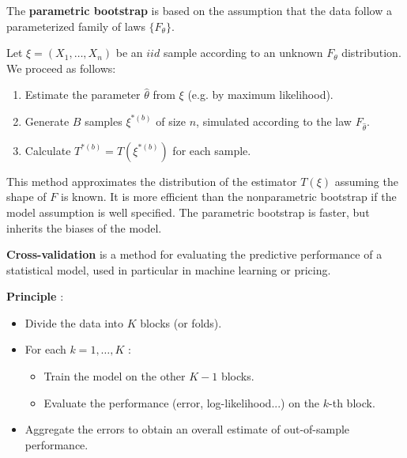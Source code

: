 \begin{f}
	
	The \textbf{parametric bootstrap} is based on the assumption that the data follow a parameterized family of laws $\{F_\theta\}$.
	
	Let $\xi = (X_1, \ldots, X_n)$ be an $iid$ sample according to an unknown $F_\theta$ distribution. We proceed as follows:
	\begin{enumerate}
		\item Estimate the parameter $\hat{\theta}$ from $\xi$ (e.g. by maximum likelihood).
		\item Generate $B$ samples $\xi^{\ast(b)}$ of size $n$, simulated according to the law $F_{\hat{\theta}}$.
		\item Calculate $T^{\ast(b)} = T(\xi^{\ast(b)})$ for each sample.
	\end{enumerate}
	
	This method approximates the distribution of the estimator $T(\xi)$ assuming the shape of $F$ is known. It is more efficient than the nonparametric bootstrap if the model assumption is well specified. The parametric bootstrap is faster, but inherits the biases of the model.
	
\end{f}

\begin{f}
	
	\textbf{Cross-validation} is a method for evaluating the predictive performance of a statistical model, used in particular in machine learning or pricing.
	
	\textbf{Principle} :
	\begin{itemize}
		\item Divide the data into $K$ blocks (or folds).
		\item For each $k = 1,\ldots,K$ :
		\begin{itemize}
			\item Train the model on the other $K-1$ blocks.
			\item Evaluate the performance (error, log-likelihood...) on the $k$-th block.
		\end{itemize}
		\item Aggregate the errors to obtain an overall estimate of out-of-sample performance.
	\end{itemize}
	
\end{f}

